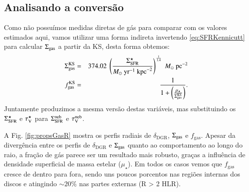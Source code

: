 
\subsection{Analisando a conversão}
\label{sec:gasfrac:gas2dust:analisradperf}

Como não possuímos medidas diretas de gás para comparar com os valores estimados aqui, vamos
utilizar uma forma indireta invertendo \eqref{eq:SFRKennicutt} para calcular $\Sigma_{\mathrm{gas}}$ a
partir da KS, desta forma obtemos:
\begin{eqnarray}
	\SigmaGas^{\mathrm{KS}} &=& 374.02\ \left(\frac{\SigmaSFR}{M_\odot\ \mathrm{yr}^{-1}\
\mathrm{kpc}^{-2}}\right)^{\frac{1}{1.4}}\ M_\odot\ \mathrm{pc}^{-2} \\
	\label{eq:SigmaGasKenn}
	f_{\mathrm{gas}}^{\mathrm{KS}} &=& \frac{1}{1 +
	\left(\frac{\mu_\star}{\SigmaGas^{\mathrm{KS}}}\right)}.
	\label{eq:fGasKenn}
\end{eqnarray}
\noindent Juntamente produzimos a mesma versão destas variáveis, mas substituindo os $\Sigma_{\mathrm{SFR}}^\star$ e
$\tau_{\mathrm{V}}^\star$ para $\Sigma_{\mathrm{SFR}}^{\mathrm{neb}}$ e $\tau_{\mathrm{V}}^{\mathrm{neb}}$.

A Fig. \ref{fig:propsGasR} mostra os perfis radiais de $\delta_{}$, $\Sigma_{\mathrm{gas}}$ e
$f_{\mathrm{gas}}$. Apesar da divergência entre os perfis de $\delta_{\mathrm{DGR}}$ e $\Sigma_{\mathrm{gas}}$
quanto ao comportamento ao longo do raio, a fração de gás parece ser um resultado mais robusto,
graças a influência de densidade superficial de massa estelar ($\mu_\star$). Em todos os casos vemos
que $f_{\mathrm{gas}}$ cresce de dentro para fora, sendo uns poucos porcentos nas regiões internas
dos discos e atingindo $\sim 20\%$ nas partes externas (R > 2 HLR). 

